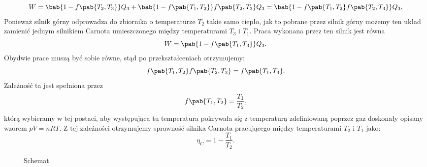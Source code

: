 \begin{equation}
W = \bab{1 - f\pab{T_2, T_3}}Q_3 + \bab{1 - f\pab{T_1, T_2}}f\pab{T_2, T_3}Q_3 = \bab{1 - f\pab{T_1, T_2}f\pab{T_2, T_3}}Q_3.
\end{equation}
Ponieważ silnik górny odprowadza do zbiornika o temperaturze $T_2$ takie samo ciepło, jak to pobrane przez silnik górny możemy ten układ zamienić jednym silnikiem Carnota umieszczonego między  temperaturami $T_3$ i $T_1$. Praca wykonana przez ten silnik jest równa
\begin{equation}
W = \pab{1 - f\pab{T_1, T_3}}Q_3.
\end{equation}
Obydwie prace muszą być sobie równe, stąd po przekształceniach otrzymujemy:
\begin{equation}
f\pab{T_1, T_2}f\pab{T_2, T_3} = f\pab{T_1, T_3}.
\end{equation}
Zależność ta jest spełniona przez
\begin{equation}
f\pab{T_1, T_2} = \frac{T_1}{T_2},
\end{equation}
którą wybieramy w tej postaci, aby występująca tu temperatura pokrywała się z temperaturą zdefiniowaną poprzez gaz doskonały opisany wzorem $pV = nRT$. Z tej zależności otrzymujemy sprawność silnika Carnota pracującego między temperaturami $T_2$ i $T_1$ jako:
\begin{equation}\label{eq:sprawnosc_carnot}
\eta_C = 1 - \frac{T_1}{T_2}.
\end{equation}
\begin{figure}[H]
	\centering
	
	\caption{Schemat}
\end{figure}
